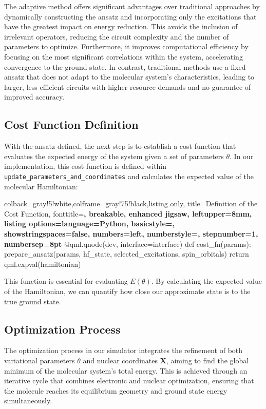 The adaptive method offers significant advantages over traditional approaches by dynamically constructing the ansatz and incorporating only the excitations that have the greatest impact on energy reduction. This avoids the inclusion of irrelevant operators, reducing the circuit complexity and the number of parameters to optimize. Furthermore, it improves computational efficiency by focusing on the most significant correlations within the system, accelerating convergence to the ground state. In contrast, traditional methods use a fixed ansatz that does not adapt to the molecular system’s characteristics, leading to larger, less efficient circuits with higher resource demands and no guarantee of improved accuracy.

\subsection{Cost Function Definition}
With the ansatz defined, the next step is to establish a cost function that evaluates the expected energy of the system given a set of parameters \(\theta\). In our implementation, this cost function is defined within \texttt{update\_parameters\_and\_coordinates} and calculates the expected value of the molecular Hamiltonian:
  
  \begin{tcblisting}{colback=gray!5!white,colframe=gray!75!black,listing only,
    title=Definition of the Cost Function, fonttitle=\bfseries, breakable, enhanced jigsaw, leftupper=8mm,
    listing options={language=Python, basicstyle=\ttfamily\small,
    showstringspaces=false, numbers=left, numberstyle=\footnotesize, stepnumber=1, numbersep=8pt}}
@qml.qnode(dev, interface=interface)
def cost_fn(params):
    prepare_ansatz(params, hf_state, selected_excitations, spin_orbitals)
    return qml.expval(hamiltonian)
  \end{tcblisting}
  
This function is essential for evaluating \(E(\theta)\). By calculating the expected value of the Hamiltonian, we can quantify how close our approximate state is to the true ground state.

\subsection{Optimization Process}

The optimization process in our simulator integrates the refinement of both variational parameters \(\theta\) and nuclear coordinates \(\mathbf{X}\), aiming to find the global minimum of the molecular system's total energy. This is achieved through an iterative cycle that combines electronic and nuclear optimization, ensuring that the molecule reaches its equilibrium geometry and ground state energy simultaneously.

